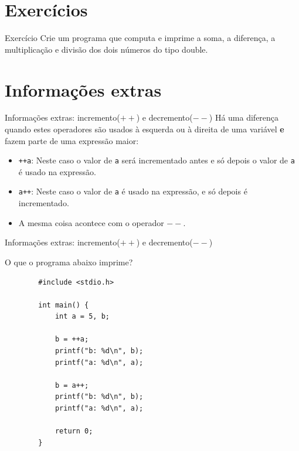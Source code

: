 \documentclass[handout]{beamer}
\begin{document}
\section{Exercícios}

\begin{frame}[fragile]{Exercício}
    Crie um programa que computa e imprime a soma, a diferença, a multiplicação e divisão dos dois números do tipo double.
\end{frame}




\section{Informações extras}


\begin{frame}[fragile]{Informações extras: incremento($++$) e decremento($--$)}
    Há uma diferença quando estes operadores são usados à esquerda ou à direita de uma variável \textbf{e} fazem parte de uma expressão maior:
    \pause
    \begin{itemize}[<+->]
        \item {\tt ++a}: Neste caso o valor de {\tt a} será incrementado antes e só depois o valor de {\tt a} é usado na expressão.
        \item {\tt a++}: Neste caso o valor de {\tt a} é usado na expressão, e só depois é incrementado.
        \item A mesma coisa acontece com o operador $--$.
    \end{itemize}
\end{frame}

\begin{frame}[fragile]{Informações extras: incremento($++$) e decremento($--$)}

    O que o programa abaixo imprime?

    \begin{verbatim}
        #include <stdio.h>

        int main() {
            int a = 5, b;

            b = ++a;
            printf("b: %d\n", b);
            printf("a: %d\n", a);

            b = a++;
            printf("b: %d\n", b);
            printf("a: %d\n", a);

            return 0;
        }
    \end{verbatim}
\end{frame}
\end{document}
